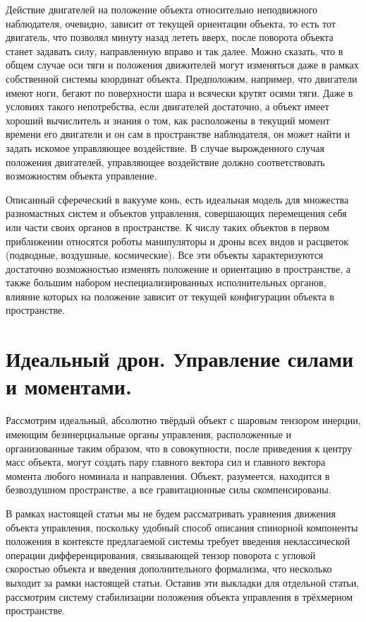 \documentclass[a4paper]{article}
\begin{document}
Действие двигателей на положение объекта относительно неподвижного наблюдателя, очевидно, зависит от текущей ориентации объекта, то есть тот двигатель, что позволял минуту назад лететь вверх, после поворота объекта станет задавать силу, направленную вправо и так далее. Можно сказать, что в общем случае оси тяги и положения движителей могут изменяться даже в рамках собственной системы координат объекта. Предположим, например, что двигатели имеют ноги, бегают по поверхности шара и всячески крутят осями тяги. Даже в условиях такого непотребства, если двигателей достаточно, а объект имеет хороший вычислитель и знания о том, как расположены в текущий момент времени его двигатели и он сам в пространстве наблюдателя, он может найти и задать искомое управляющее воздействие. В случае вырожденного случая положения двигателей, управляющее воздействие должно соответствовать возможностям объекта управление.

Описанный сфереческий в вакууме конь, есть идеальная модель для множества разномастных систем и объектов управления, совершающих перемещения себя или части своих органов в пространстве. К числу таких объектов в первом приближении относятся роботы манипуляторы и дроны всех видов и расцветок (подводные, воздушные, космические). Все эти объекты характеризуются достаточно возможностью изменять положение и ориентацию в пространстве, а также большим набором неспециализированных исполнительных органов, влияние которых на положение зависит от текущей конфигурации объекта в пространстве.

\section{Идеальный дрон. Управление силами и моментами.}
Рассмотрим идеальный, абсолютно твёрдый объект с шаровым тензором инерции, имеющим безинерциальные органы управления, расположенные и организованные таким образом, что в совокупности, после приведения к центру масс объекта, могут создать пару главного вектора сил и главного вектора момента любого номинала и направления. Объект, разумеется, находится в безвоздушном пространстве, а все гравитационные силы скомпенсированы.

В рамках настоящей статьи мы не будем рассматривать уравнения движения объекта управления, поскольку удобный способ описания спинорной компоненты положения в контексте предлагаемой системы требует введения неклассической операции дифференцирования, связывающей тензор поворота с угловой скоростью объекта и введения дополнительного формализма, что несколько выходит за рамки настоящей статьи. Оставив эти выкладки для отдельной статьи, рассмотрим систему стабилизации положения объекта управления в трёхмерном пространстве.
\end{document}
